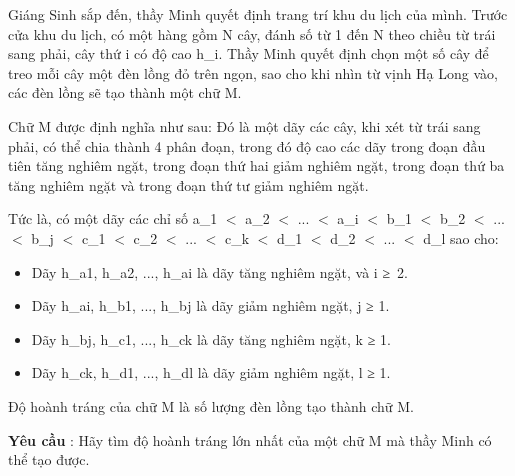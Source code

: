 Giáng Sinh sắp đến, thầy Minh quyết định trang trí khu du lịch của mình. Trước cửa khu du lịch, có một hàng gồm N cây, đánh số từ 1 đến N theo chiều từ trái sang phải, cây thứ i có độ cao h\_i. Thầy Minh quyết định chọn một số cây để treo mỗi cây một đèn lồng đỏ trên ngọn, sao cho khi nhìn từ vịnh Hạ Long vào, các đèn lồng sẽ tạo thành một chữ M.  

   Chữ M được định nghĩa như sau: Đó là một dãy các cây, khi xét từ trái sang phải, có thể chia thành 4 phân đoạn, trong đó độ cao các dãy trong đoạn đầu tiên tăng nghiêm ngặt, trong đoạn thứ hai giảm nghiêm ngặt, trong đoạn thứ ba tăng nghiêm ngặt và trong đoạn thứ tư giảm nghiêm ngặt.  

   Tức là, có một dãy các chỉ số a\_1 $<$ a\_2 $<$ ... $<$ a\_i $<$ b\_1 $<$ b\_2 $<$ ... $<$ b\_j $<$ c\_1 $<$ c\_2 $<$ ... $<$ c\_k $<$ d\_1 $<$ d\_2 $<$ ... $<$ d\_l sao cho:  
\begin{itemize}
	\item     Dãy h\_a1, h\_a2, ..., h\_ai là dãy tăng nghiêm ngặt, và i ≥ 2.   
	\item     Dãy h\_ai, h\_b1, ..., h\_bj là dãy giảm nghiêm ngặt, j         ≥        1.   
	\item     Dãy h\_bj, h\_c1, ..., h\_ck là dãy tăng nghiêm ngặt, k         ≥ 1.    
	\item      Dãy h\_ck, h\_d1, ..., h\_dl là dãy giảm nghiêm ngặt, l           ≥ 1.     
\end{itemize}

   Độ hoành tráng của chữ M là số lượng đèn lồng tạo thành chữ M.  

\textbf{    Yêu cầu   }   : Hãy tìm độ hoành tráng lớn nhất của một chữ M mà thầy Minh có thể tạo được.  

\